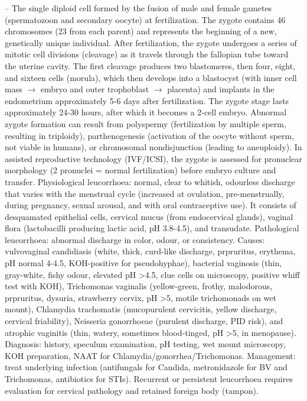 -- The single diploid cell formed by the fusion of male and female gametes (spermatozoon and secondary oocyte) at fertilization. The zygote contains 46 chromosomes (23 from each parent) and represents the beginning of a new, genetically unique individual. After fertilization, the zygote undergoes a series of mitotic cell divisions (cleavage) as it travels through the fallopian tube toward the uterine cavity. The first cleavage produces two blastomeres, then four, eight, and sixteen cells (morula), which then develops into a blastocyst (with inner cell mass $\rightarrow$ embryo and outer trophoblast $\rightarrow$ placenta) and implants in the endometrium approximately 5-6 days after fertilization. The zygote stage lasts approximately 24-30 hours, after which it becomes a 2-cell embryo. Abnormal zygote formation can result from polyspermy (fertilization by multiple sperm, resulting in triploidy), parthenogenesis (activation of the oocyte without sperm, not viable in humans), or chromosomal nondisjunction (leading to aneuploidy). In assisted reproductive technology (IVF/ICSI), the zygote is assessed for pronuclear morphology (2 pronuclei = normal fertilization) before embryo culture and transfer. Physiological leucorrhoea: normal, clear to whitish, odourless discharge that varies with the menstrual cycle (increased at ovulation, pre-menstrually, during pregnancy, sexual arousal, and with oral contraceptive use). It consists of desquamated epithelial cells, cervical mucus (from endocervical glands), vaginal flora (lactobacilli producing lactic acid, pH 3.8-4.5), and transudate. Pathological leucorrhoea: abnormal discharge in color, odour, or consistency. Causes: vulvovaginal candidiasis (white, thick, curd-like discharge, prpruritus, erythema, pH normal 4-4.5, KOH-positive for pseudohyphae), bacterial vaginosis (thin, gray-white, fishy odour, elevated pH >4.5, clue cells on microscopy, positive whiff test with KOH), Trichomonas vaginalis (yellow-green, frothy, malodorous, prpruritus, dysuria, strawberry cervix, pH >5, motile trichomonads on wet mount), Chlamydia trachomatis (mucopurulent cervicitis, yellow discharge, cervical friability), Neisseria gonorrhoeae (purulent discharge, PID risk), and atrophic vaginitis (thin, watery, sometimes blood-tinged, pH >5, in menopause). Diagnosis: history, speculum examination, pH testing, wet mount microscopy, KOH preparation, NAAT for Chlamydia/gonorrhea/Trichomonas. Management: treat underlying infection (antifungals for Candida, metronidazole for BV and Trichomonas, antibiotics for STIs). Recurrent or persistent leucorrhoea requires evaluation for cervical pathology and retained foreign body (tampon).
